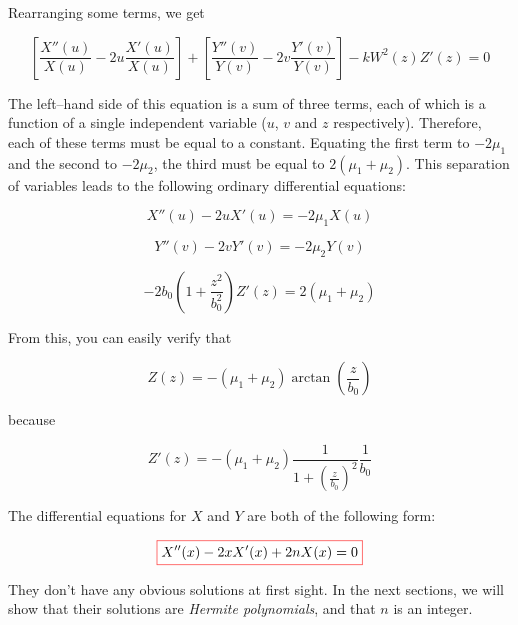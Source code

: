 Rearranging some terms, we get

\begin{equation}
\left[{\frac{X''(u)}{X(u)} - 2 u\frac{X'(u)}{X(u)}}\right] + 
\left[{\frac{Y''(v)}{Y(v)} - 2 v\frac{Y'(v)}{Y(v)}}\right] -kW^2(z)Z'(z) = 0
\end{equation} 

The left--hand side of this equation is a sum of three terms, each of which is a function of a single independent variable ($u$, $v$ and $z$ respectively). Therefore, each of these terms must be equal to a constant. Equating the first term to $-2\mu_1$ and the second to $-2\mu_2$, the third must be equal to $2(\mu_1+\mu_2)$. This separation of variables leads to the following ordinary differential equations:

\begin{equation}
X''(u) - 2 u X'(u) = - 2 \mu_1 X(u) 
\end{equation} 

\begin{equation}
Y''(v) - 2 v Y'(v) = - 2 \mu_2 Y(v)
\end{equation} 

\begin{equation}
-2b_0\left(1 + \frac{z^2}{b_0^2}\right)Z'(z) = 2(\mu_1+\mu_2)
\end{equation} 

From this, you can easily verify that 

$$Z(z) = -(\mu_1+\mu_2) \arctan\left(\frac{z}{b_0}\right)$$

because

\begin{equation}
Z'(z) = -(\mu_1+\mu_2) \frac{1}{1+\left(\frac{z}{b_0}\right)^2} \frac{1}{b_0}
\end{equation} 

The differential equations for $X$ and $Y$ are both of the following form: 

\begin{equation}
\fbox{$\displaystyle
X''(x) - 2 x X'(x) + 2 n X(x) = 0 \label{eq-diff-hermite-0}
$}
\end{equation} 

They don't have any obvious solutions at first sight. In the next sections, we will show that their solutions are \emph{Hermite polynomials}, and that $n$ is an integer.

